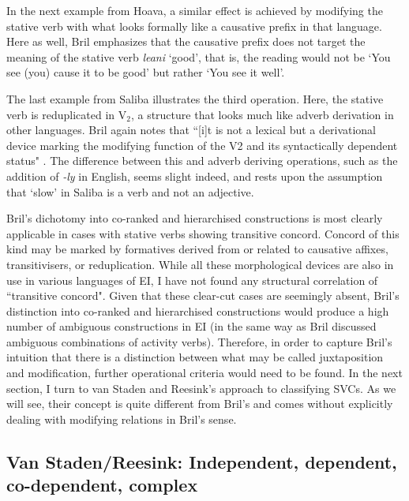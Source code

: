 In the next example from Hoava, a similar effect is achieved by modifying the stative verb with what looks formally like a causative prefix in that language. Here as well, Bril emphasizes that the causative prefix does not target the meaning of the stative verb \textit{leani} `good', that is, the reading would not be `You see (you) cause it to be good' but rather `You see it well'.

The last example from Saliba illustrates the third operation. Here, the stative verb is reduplicated in V$_2$, a structure that looks much like adverb derivation in other languages. Bril again notes that ``[i]t is not a lexical but a derivational device marking the modifying function of the V2 and its syntactically dependent status" \citep[273]{bril2007nexus}. The difference between this and adverb deriving operations, such as the addition of \textit{-ly} in English, seems slight indeed, and rests upon the assumption that `slow' in Saliba is a verb and not an adjective.

Bril's dichotomy into co-ranked and hierarchised constructions is most clearly applicable in cases with stative verbs showing transitive concord. Concord of this kind may be marked by formatives derived from or related to causative affixes, transitivisers, or reduplication. While all these morphological devices are also in use in various languages of EI, I have not found any structural correlation of ``transitive concord". Given that these clear-cut cases are seemingly absent, Bril's distinction into co-ranked and hierarchised constructions would produce a high number of ambiguous constructions in EI (in the same way as Bril discussed ambiguous combinations of activity verbs). Therefore, in order to capture Bril's intuition that there is a distinction between what may be called juxtaposition and modification, further operational criteria would need to be found. In the next section, I turn to van Staden and Reesink's approach to classifying SVCs. As we will see, their concept is quite different from Bril's and comes without explicitly dealing with modifying relations in Bril's sense.

\subsection[Van Staden/Reesink: Independent, dependent, ...]{Van Staden/Reesink: Independent, dependent, co-dependent, complex%
}

